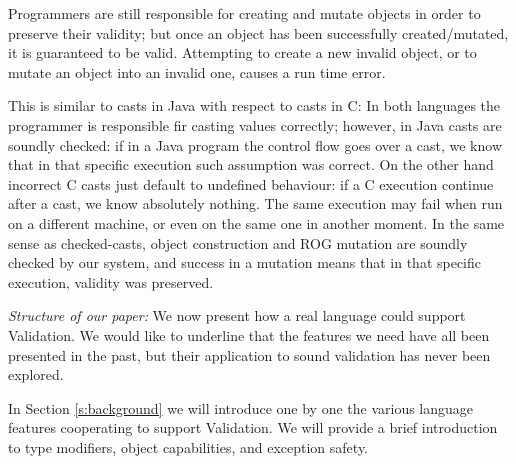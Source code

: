 Programmers are still responsible for creating and mutate objects in order to preserve their validity;
but once an object has been successfully created/mutated, it is guaranteed to be valid.
Attempting to create a new invalid object, or to mutate an object into an invalid one, causes
a run time error.

This is similar to casts in Java with respect to casts in C:
In both languages the programmer is responsible fir casting values correctly;
however, in Java casts are soundly checked: if in a Java program the control flow goes over a cast,
we know that in that specific
execution such assumption was correct.
On the other hand incorrect C casts just default to undefined behaviour:
if a C execution continue after a cast, we know absolutely nothing. The same execution
may fail when run on a different machine, 
or even on the same one in another moment.
In the same sense as checked-casts, object construction and ROG mutation are soundly checked by our system,
and success in a mutation means that in that specific execution, validity was preserved.




%
%  
% 
%
%
%
%
%
%
%
%
%
%
%
%
%
%
%
%
%



\noindent\textit{Structure of our paper:} We now present how a real language could support
Validation. 
We would like to underline that the
features we need have all been presented in the past, but their application to sound validation has never been explored.

In Section \ref{s:background} we will introduce one by one the various
language features cooperating
to support Validation. %
We will provide a brief introduction to type modifiers, object capabilities, and exception safety.

